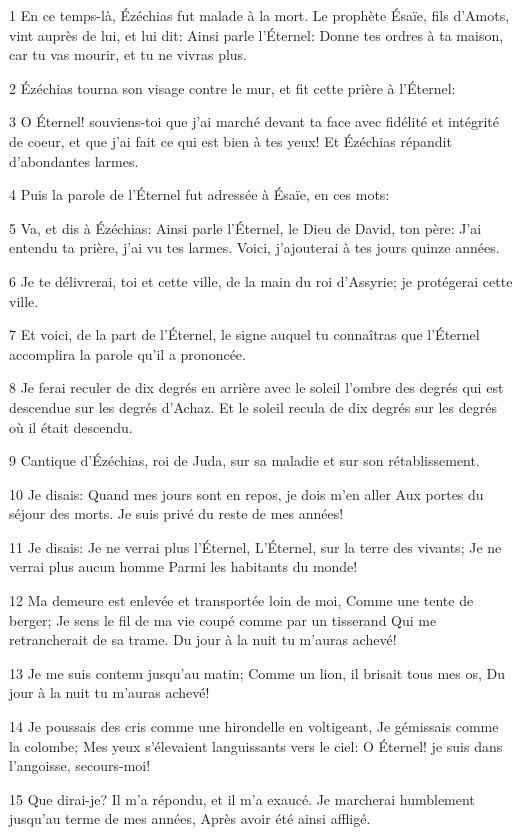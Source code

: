 \par 1 En ce temps-là, Ézéchias fut malade à la mort. Le prophète Ésaïe, fils d'Amots, vint auprès de lui, et lui dit: Ainsi parle l'Éternel: Donne tes ordres à ta maison, car tu vas mourir, et tu ne vivras plus.
\par 2 Ézéchias tourna son visage contre le mur, et fit cette prière à l'Éternel:
\par 3 O Éternel! souviens-toi que j'ai marché devant ta face avec fidélité et intégrité de coeur, et que j'ai fait ce qui est bien à tes yeux! Et Ézéchias répandit d'abondantes larmes.
\par 4 Puis la parole de l'Éternel fut adressée à Ésaïe, en ces mots:
\par 5 Va, et dis à Ézéchias: Ainsi parle l'Éternel, le Dieu de David, ton père: J'ai entendu ta prière, j'ai vu tes larmes. Voici, j'ajouterai à tes jours quinze années.
\par 6 Je te délivrerai, toi et cette ville, de la main du roi d'Assyrie; je protégerai cette ville.
\par 7 Et voici, de la part de l'Éternel, le signe auquel tu connaîtras que l'Éternel accomplira la parole qu'il a prononcée.
\par 8 Je ferai reculer de dix degrés en arrière avec le soleil l'ombre des degrés qui est descendue sur les degrés d'Achaz. Et le soleil recula de dix degrés sur les degrés où il était descendu.
\par 9 Cantique d'Ézéchias, roi de Juda, sur sa maladie et sur son rétablissement.
\par 10 Je disais: Quand mes jours sont en repos, je dois m'en aller Aux portes du séjour des morts. Je suis privé du reste de mes années!
\par 11 Je disais: Je ne verrai plus l'Éternel, L'Éternel, sur la terre des vivants; Je ne verrai plus aucun homme Parmi les habitants du monde!
\par 12 Ma demeure est enlevée et transportée loin de moi, Comme une tente de berger; Je sens le fil de ma vie coupé comme par un tisserand Qui me retrancherait de sa trame. Du jour à la nuit tu m'auras achevé!
\par 13 Je me suis contenu jusqu'au matin; Comme un lion, il brisait tous mes os, Du jour à la nuit tu m'auras achevé!
\par 14 Je poussais des cris comme une hirondelle en voltigeant, Je gémissais comme la colombe; Mes yeux s'élevaient languissants vers le ciel: O Éternel! je suis dans l'angoisse, secours-moi!
\par 15 Que dirai-je? Il m'a répondu, et il m'a exaucé. Je marcherai humblement jusqu'au terme de mes années, Après avoir été ainsi affligé.
